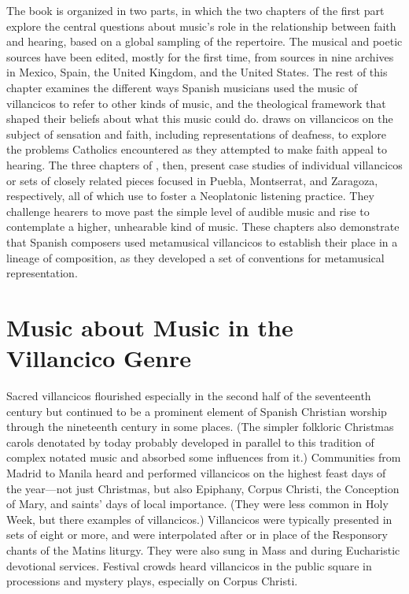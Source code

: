 The book is organized in two parts, in which the two chapters of the first part
explore the central questions about music's role in the relationship between
faith and hearing, based on a global sampling of the repertoire.
The musical and poetic sources have been edited, mostly for the first time,
from sources in nine archives in Mexico, Spain, the United Kingdom, and the
United States.
The rest of this chapter examines the different ways Spanish musicians used
the music of villancicos to refer to other kinds of music, and the theological
framework that shaped their beliefs about what this music could do.
 draws on villancicos on the subject of sensation and
faith, including representations of deafness, to explore the problems Catholics
encountered as they attempted to make faith appeal to hearing.
The three chapters of , then, present case studies
of individual villancicos or sets of closely related pieces focused in Puebla,
Montserrat, and Zaragoza, respectively, all of which use  to foster a Neoplatonic listening practice.
They challenge hearers to move past the simple level of audible music and rise
to contemplate a higher, unhearable kind of music.
These chapters also demonstrate that Spanish composers used metamusical
villancicos to establish their place in a lineage of composition, as they
developed a set of conventions for metamusical representation.

\section{Music about Music in the Villancico Genre}

Sacred villancicos flourished especially in the second half of the seventeenth
century but continued to be a prominent element of Spanish Christian worship
through the nineteenth century in some places.
(The simpler folkloric Christmas carols denotated by  today
probably developed in parallel to this tradition of complex notated music and
absorbed some influences from it.)
Communities from Madrid to Manila heard and performed villancicos on the
highest feast days of the year---not just Christmas, but also Epiphany, Corpus
Christi, the Conception of Mary, and saints' days of local importance.
(They were less common in Holy Week, but there examples of 
villancicos.)
Villancicos were typically presented in sets of eight or more, and were
interpolated after or in place of the Responsory chants of the Matins liturgy.
They were also sung in Mass and during Eucharistic devotional services.
Festival crowds heard villancicos in the public square in processions and
mystery plays, especially on Corpus Christi.

